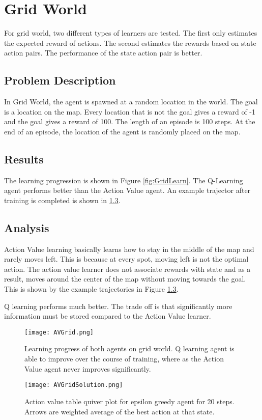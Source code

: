 
\section{Grid World}
For grid world, two different types of learners are tested.  The first only estimates the expected reward of actions.  The second estimates the rewards based on state action pairs.  The performance of the state action pair is better.

\subsection{Problem Description}
In Grid World, the agent is spawned at a random location in the world.  The goal is a location on the map.  Every location that is not the goal gives a reward of -1 and the goal gives a reward of 100.  The length of an episode is 100 steps.  At the end of an episode, the location of the agent is randomly placed on the map.

\subsection{Results}
The learning progression is shown in Figure \ref{fig:GridLearn}.  The Q-Learning agent performs better than the Action Value agent.  An example trajector after training is completed is shown in \ref{}.

\subsection{Analysis}
Action Value learning basically learns how to stay in the middle of the map and rarely moves left.  This is because at every spot, moving left is not the optimal action.  The action value learner does not associate rewards with state and as a result, moves around the center of the map without moving towards the goal.  This is shown by the example trajectories in Figure \ref{}.

Q learning performs much better.  The trade off is that significantly more information must be stored compared to the Action Value learner.


\begin{figure}[h]
\texttt{[image: AVGrid.png]}
\caption{Learning progress of both agents on grid world.  Q learning agent is able to improve over the course of training, where as the Action Value agent never improves significantly.}
\label{fig:GriudLearn}
\end{figure}

\begin{figure}[h]
\texttt{[image: AVGridSolution.png]}
\caption{Action value table quiver plot for epsilon greedy agent for 20 steps.  Arrows are weighted average of the best action at that state.}
\label{fig:AVGridSolution}
\end{figure}


